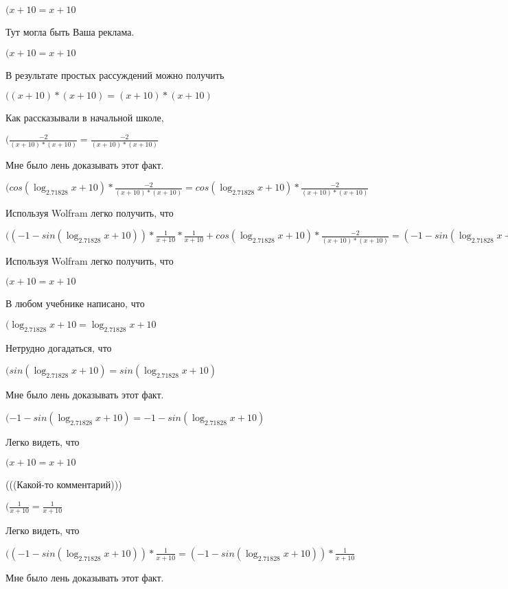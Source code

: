 \documentclass[12pt,a4paper,fleqn]{article}
\theoremstyle{definition}
\begin{document}
$( x  +  10  =  x  +  10 $

Тут могла быть Ваша реклама.

$( x  +  10  =  x  +  10 $

В результате простых рассуждений можно получить

$(( x  +  10 ) * ( x  +  10 ) = ( x  +  10 ) * ( x  +  10 )$

Как рассказывали в начальной школе,

$(\frac{ -2 }{( x  +  10 ) * ( x  +  10 )}
 = \frac{ -2 }{( x  +  10 ) * ( x  +  10 )}
$

Мне было лень доказывать этот факт.

$(cos(\log_{ 2.71828 }{ x  +  10 }) * \frac{ -2 }{( x  +  10 ) * ( x  +  10 )}
 = cos(\log_{ 2.71828 }{ x  +  10 }) * \frac{ -2 }{( x  +  10 ) * ( x  +  10 )}
$

Используя Wolfram легко получить, что

$(( -1  - sin(\log_{ 2.71828 }{ x  +  10 })) * \frac{ 1 }{ x  +  10 }
 * \frac{ 1 }{ x  +  10 }
 + cos(\log_{ 2.71828 }{ x  +  10 }) * \frac{ -2 }{( x  +  10 ) * ( x  +  10 )}
 = ( -1  - sin(\log_{ 2.71828 }{ x  +  10 })) * \frac{ 1 }{ x  +  10 }
 * \frac{ 1 }{ x  +  10 }
 + cos(\log_{ 2.71828 }{ x  +  10 }) * \frac{ -2 }{( x  +  10 ) * ( x  +  10 )}
$

Используя Wolfram легко получить, что

$( x  +  10  =  x  +  10 $

В любом учебнике написано, что

$(\log_{ 2.71828 }{ x  +  10 } = \log_{ 2.71828 }{ x  +  10 }$

Нетрудно догадаться, что

$(sin(\log_{ 2.71828 }{ x  +  10 }) = sin(\log_{ 2.71828 }{ x  +  10 })$

Мне было лень доказывать этот факт.

$( -1  - sin(\log_{ 2.71828 }{ x  +  10 }) =  -1  - sin(\log_{ 2.71828 }{ x  +  10 })$

Легко видеть, что

$( x  +  10  =  x  +  10 $

(((Какой-то комментарий)))

$(\frac{ 1 }{ x  +  10 }
 = \frac{ 1 }{ x  +  10 }
$

Легко видеть, что

$(( -1  - sin(\log_{ 2.71828 }{ x  +  10 })) * \frac{ 1 }{ x  +  10 }
 = ( -1  - sin(\log_{ 2.71828 }{ x  +  10 })) * \frac{ 1 }{ x  +  10 }
$

Мне было лень доказывать этот факт.
\end{document}
